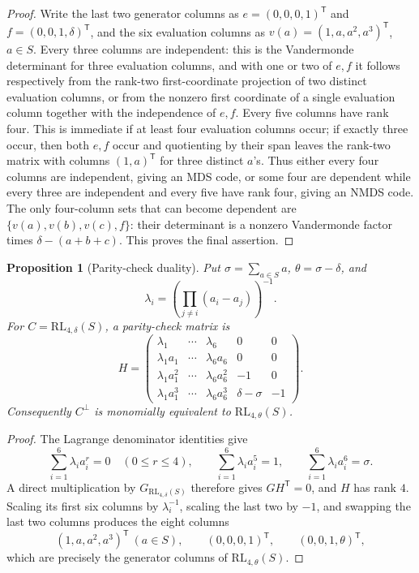 \documentclass[11pt]{article}
\newcommand{\RL}{\mathrm{RL}}
\theoremstyle{plain}
\newtheorem{proposition}{Proposition}
\theoremstyle{definition}
\begin{document}
\begin{proof}
Write the last two generator columns as
\(e=(0,0,0,1)^{\mathsf T}\) and
\(f=(0,0,1,\delta)^{\mathsf T}\), and the six evaluation columns as
\(v(a)=(1,a,a^2,a^3)^{\mathsf T}\), \(a\in S\).  Every three columns are
independent: this is the Vandermonde determinant for three evaluation
columns, and with one or two of \(e,f\) it follows respectively from the
rank-two first-coordinate projection of two distinct evaluation columns, or
from the nonzero first coordinate of a single evaluation column together
with the independence of \(e,f\).  Every
five columns have rank four.  This is immediate if at least four evaluation
columns occur; if exactly three occur, then both \(e,f\) occur and quotienting
by their span leaves the rank-two matrix with columns \((1,a)^{\mathsf T}\)
for three distinct \(a\)'s.  Thus either every four columns are independent,
giving an MDS code, or some four are dependent while every three are
independent and every five have rank four, giving an NMDS code.
The only four-column sets that can become dependent are
\(\{v(a),v(b),v(c),f\}\): their determinant is a nonzero Vandermonde
factor times \(\delta-(a+b+c)\).  This proves the final assertion.
\end{proof}

\begin{proposition}[Parity-check duality]\label{prop:duality}
Put \(\sigma=\sum_{a\in S}a\), \(\theta=\sigma-\delta\), and
\[
  \lambda_i=\left(\prod_{j\ne i}(a_i-a_j)\right)^{-1}.
\]
For \(C=\RL_{4,\delta}(S)\), a parity-check matrix is
\[
H=
\begin{pmatrix}
\lambda_1&\cdots&\lambda_6&0&0\\
\lambda_1a_1&\cdots&\lambda_6a_6&0&0\\
\lambda_1a_1^2&\cdots&\lambda_6a_6^2&-1&0\\
\lambda_1a_1^3&\cdots&\lambda_6a_6^3&\delta-\sigma&-1
\end{pmatrix}.
\]
Consequently \(C^\perp\) is monomially equivalent to
\(\RL_{4,\theta}(S)\).
\end{proposition}

\begin{proof}
The Lagrange denominator identities give
\[
 \sum_{i=1}^6\lambda_i a_i^r=0\quad(0\le r\le4),
 \qquad
 \sum_{i=1}^6\lambda_i a_i^5=1,
 \qquad
 \sum_{i=1}^6\lambda_i a_i^6=\sigma.
\]
A direct multiplication by \(G_{\RL_{4,\delta}(S)}\) therefore gives
\(GH^{\mathsf T}=0\), and \(H\) has rank \(4\).  Scaling its first six
columns by \(\lambda_i^{-1}\), scaling the last two by \(-1\), and swapping
the last two columns produces the eight columns
\[
 (1,a,a^2,a^3)^{\mathsf T}\ (a\in S),\qquad
 (0,0,0,1)^{\mathsf T},\qquad(0,0,1,\theta)^{\mathsf T},
\]
which are precisely the generator columns of \(\RL_{4,\theta}(S)\).
\end{proof}
\end{document}
